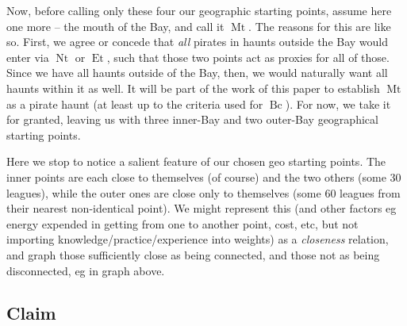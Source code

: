 \documentclass{amsart}
\newcommand{\mention}[1]{\textit{#1}}%
\DeclareMathOperator{\mt}{Mt}%
\DeclareMathOperator{\bc}{Bc}%
\DeclareMathOperator{\et}{Et}%
\DeclareMathOperator{\nt}{Nt}%
\theoremstyle{definition}%
\theoremstyle{definition}%
\theoremstyle{remark}%
\begin{document}
Now, before calling only these four our geographic starting points, assume here one more -- the mouth of the Bay, and call it \(\mt\). The reasons for this are like so. First, we agree or concede that \emph{all} pirates in haunts outside the Bay would enter via \(\nt\) or \(\et\), such that those two points act as proxies for all of those. Since we have all haunts outside of the Bay, then, we would naturally want all haunts within it as well. It will be part of the work of this paper to establish \(\mt\) as a pirate haunt (at least up to the criteria used for \(\bc\)). For now, we take it for granted, leaving us with three inner-Bay and two outer-Bay geographical starting points.

Here we stop to notice a salient feature of our chosen geo starting points. The inner points are each close to themselves (of course) and the two others (some 30 leagues), while the outer ones are close only to themselves (some 60 leagues from their nearest non-identical point). We might represent this (and other factors eg energy expended in getting from one to another point, cost, etc, but not importing knowledge/practice/experience into weights) as a \mention{closeness} relation, and graph those sufficiently close as being connected, and those not as being disconnected, eg in graph above.
\subsection{Claim}
%
%
%
%
\end{document}

